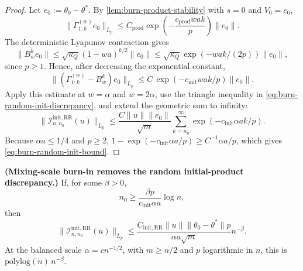 \begin{proof} Let $e_{0} := \theta_{0} - \theta^{*}$. By \cref{lem:burn-product-stability} with
$s = 0$ and $V_{0} = e_{0}$,
\[
\lVert \Gamma_{1:k}^{(w)} e_{0} \rVert_{L_{p}}
  \le C_{\mathrm{prod}} \exp\left(- \frac{c_{\mathrm{prod}} w a k}{p}\right) \lVert e_{0} \rVert.
\]
The deterministic Lyapunov contraction gives
\[
\lVert B_{w}^{k} e_{0} \rVert
  \le \sqrt{\kappa_{Q}} (1 - w a)^{k / 2} \lVert e_{0} \rVert
  \le \sqrt{\kappa_{Q}} \exp\left(-w a k / (2 p)\right) \lVert e_{0} \rVert,
\]
since $p \ge 1$. Hence, after decreasing the exponential constant,
\[
\lVert \left( \Gamma_{1:k}^{(w)} - B_{w}^{k} \right) e_{0} \rVert_{L_{p}}
  \le C \, \exp\left(-c_{\mathrm{init}} w a k / p\right) \lVert e_{0} \rVert.
\]
Apply this estimate at $w = \alpha$ and $w = 2 \alpha$, use the triangle
inequality in \eqref{eq:burn-random-init-discrepancy}, and extend the geometric sum
to infinity:
\[
\lVert \mathcal{I}_{n,n_{0}}^{\mathrm{init,RR}}(u) \rVert_{L_{p}}
  \le \frac{C \lVert u \rVert \lVert e_{0} \rVert}{\sqrt{m}}
     \sum_{k = n_{0}}^{\infty} \exp\left(-c_{\mathrm{init}} \alpha a k / p\right).
\]
Because $\alpha a \le 1 / 4$ and $p \ge 2$,
$1 - \exp\left(-c_{\mathrm{init}} \alpha a / p\right) \ge C^{-1} \alpha a / p$, which gives
\eqref{eq:burn-random-init-bound}. \end{proof}

\begin{corollary}\label{cor:burn-log-initial-product}
  \textbf{(Mixing-scale burn-in removes the random initial-product discrepancy.)}
  If, for some $\beta > 0$,
  \begin{equation}
n_{0} \ge \frac{\beta p}{c_{\mathrm{init}} \alpha a} \log n,
\label{eq:burn-log-init-condition}
\end{equation}
  then
  \begin{equation}
\lVert \mathcal{I}_{n,n_{0}}^{\mathrm{init,RR}}(u) \rVert_{L_{p}}
    \le \frac{C_{\mathrm{init,RR}} \lVert u \rVert \lVert \theta_{0} - \theta^{*} \rVert p}{\alpha a \sqrt{m}} n^{-\beta}.
\label{eq:burn-log-init-bound}
\end{equation}
  At the balanced scale $\alpha = c n^{-1 / 2}$, with
  $m \ge n / 2$ and $p$ logarithmic in $n$, this is
  $\mathrm{polylog}(n) \, n^{-\beta}$.
\end{corollary}

